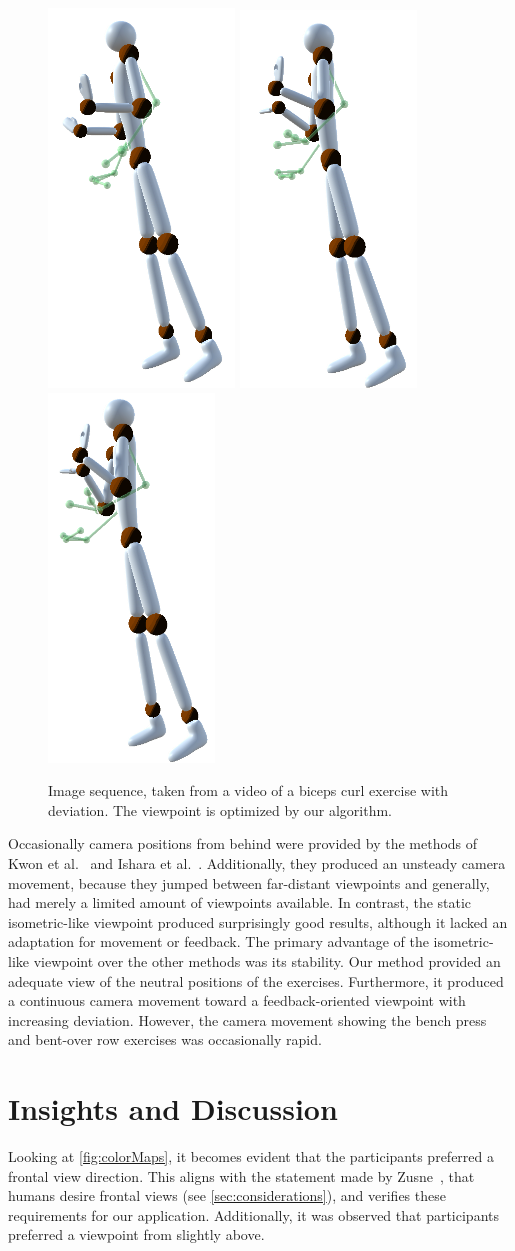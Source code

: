 \begin{figure}[h]
	\includegraphics[width=0.115\linewidth]{pictures/bicepsSequence6.png}\hfill
	\includegraphics[width=0.11\linewidth]{pictures/bicepsSequence7.png}\hfill
	\includegraphics[width=0.11\linewidth]{pictures/bicepsSequence8.png}\hfill
	\caption[Image sequence optimized by our method.]{Image sequence, taken from a video of a biceps curl exercise with deviation. The viewpoint is optimized by our algorithm.}
	\label{fig:bicepsSequence}
\end{figure}

Occasionally camera positions from behind were provided by the methods of Kwon et al.~\cite{kwon2020ocp} and Ishara et al.~\cite{ishara2015mra}. Additionally, they produced an unsteady camera movement, because they jumped between far-distant viewpoints and generally, had merely a limited amount of viewpoints available. In contrast, the static isometric-like viewpoint produced surprisingly good results, although it lacked an adaptation for movement or feedback. The primary advantage of the isometric-like viewpoint over the other methods was its stability. Our method provided an adequate view of the neutral positions of the exercises. Furthermore, it produced a continuous camera movement toward a feedback-oriented viewpoint with increasing deviation. However, the camera movement showing the bench press and bent-over row exercises was occasionally rapid.

\section{Insights and Discussion\label{sec:insights}}
Looking at \autoref{fig:colorMaps}, it becomes evident that the participants preferred a frontal view direction. This aligns with the statement made by Zusne~\cite{zusne1970vpf}, that humans desire frontal views (see \autoref{sec:considerations}), and verifies these requirements for our application. Additionally, it was observed that participants preferred a viewpoint from slightly above.

